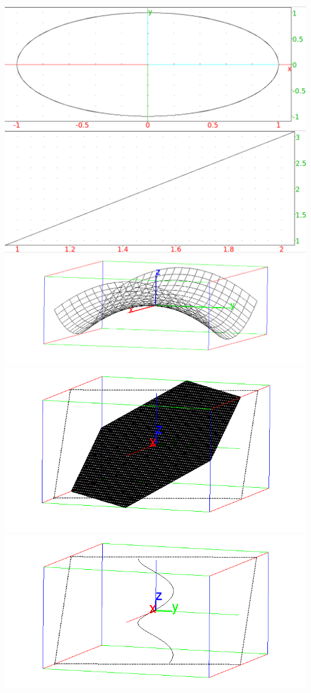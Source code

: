 \documentclass{article}
\begin{document}
\includegraphics[width=\textwidth]{xcas-plotparam.png}
\clearpage%
\includegraphics[width=\textwidth]{xcas-tangent.png}
\clearpage%
\includegraphics[width=\textwidth]{xcas-3dplot.png}
\clearpage%
\includegraphics[width=\textwidth]{xcas-3dparam.png}
\clearpage%
\includegraphics[width=\textwidth]{xcas-3dcurve.png}
\clearpage%
\end{document}
